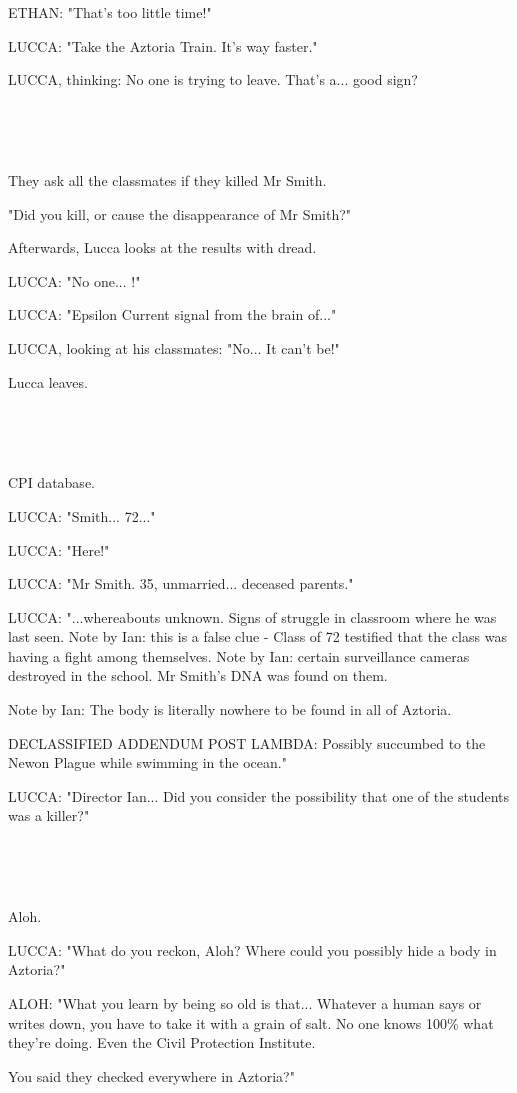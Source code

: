 \documentclass[11pt]{article}
\begin{document}
ETHAN: "That's too little time!"

LUCCA: "Take the Aztoria Train. It's way faster."

LUCCA, thinking: No one is trying to leave. 
That's a... good sign?

\ 

\ 

They ask all the classmates if they killed Mr Smith.

"Did you kill, or cause the disappearance of Mr Smith?"

Afterwards, Lucca looks at the results with dread.

LUCCA: "No one... !"

LUCCA: "Epsilon Current signal from the brain of..."

LUCCA, looking at his classmates: "No... It can't be!"

Lucca leaves.

\ 

\ 

CPI database.

LUCCA: "Smith... 72..."

LUCCA: "Here!"

LUCCA: "Mr Smith. 35, unmarried... deceased parents."

LUCCA: "...whereabouts unknown.
Signs of struggle in classroom where he was last seen. 
Note by Ian: this is a false clue - Class of 72 testified that the class was having a fight among themselves.
Note by Ian: certain surveillance cameras destroyed in the school.
Mr Smith's DNA was found on them.

Note by Ian:
The body is literally nowhere to be found in all of Aztoria.

DECLASSIFIED ADDENDUM POST LAMBDA:
Possibly succumbed to the Newon Plague while swimming in the ocean."

LUCCA: "Director Ian... Did you consider the possibility that one of the students was a killer?"

\ 

\ 

Aloh.

LUCCA: "What do you reckon, Aloh? Where could you possibly hide a body in Aztoria?"

ALOH: "What you learn by being so old is that... Whatever a human says or writes down, you have to take it with a grain of salt.
No one knows 100\% what they're doing.
Even the Civil Protection Institute.

You said they checked everywhere in Aztoria?"
\end{document}
